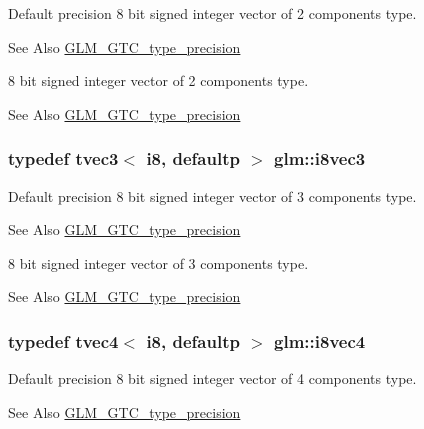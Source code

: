 Default precision 8 bit signed integer vector of 2 components type. \begin{DoxySeeAlso}{See Also}
\hyperlink{group__gtc__type__precision}{G\-L\-M\-\_\-\-G\-T\-C\-\_\-type\-\_\-precision}
\end{DoxySeeAlso}
8 bit signed integer vector of 2 components type. \begin{DoxySeeAlso}{See Also}
\hyperlink{group__gtc__type__precision}{G\-L\-M\-\_\-\-G\-T\-C\-\_\-type\-\_\-precision} 
\end{DoxySeeAlso}
\hypertarget{group__gtc__type__precision_ga97a6cae79db311cdd47c4e88a5855987}{
\subsubsection[{i8vec3}]{\setlength{\rightskip}{0pt plus 5cm}typedef tvec3$<$ i8, defaultp $>$ {\bf glm\-::i8vec3}}}\label{group__gtc__type__precision_ga97a6cae79db311cdd47c4e88a5855987}
Default precision 8 bit signed integer vector of 3 components type. \begin{DoxySeeAlso}{See Also}
\hyperlink{group__gtc__type__precision}{G\-L\-M\-\_\-\-G\-T\-C\-\_\-type\-\_\-precision}
\end{DoxySeeAlso}
8 bit signed integer vector of 3 components type. \begin{DoxySeeAlso}{See Also}
\hyperlink{group__gtc__type__precision}{G\-L\-M\-\_\-\-G\-T\-C\-\_\-type\-\_\-precision} 
\end{DoxySeeAlso}
\hypertarget{group__gtc__type__precision_gafbf10a778016eba57d44beb585f2dc49}{
\subsubsection[{i8vec4}]{\setlength{\rightskip}{0pt plus 5cm}typedef tvec4$<$ i8, defaultp $>$ {\bf glm\-::i8vec4}}}\label{group__gtc__type__precision_gafbf10a778016eba57d44beb585f2dc49}
Default precision 8 bit signed integer vector of 4 components type. \begin{DoxySeeAlso}{See Also}
\hyperlink{group__gtc__type__precision}{G\-L\-M\-\_\-\-G\-T\-C\-\_\-type\-\_\-precision}
\end{DoxySeeAlso}
